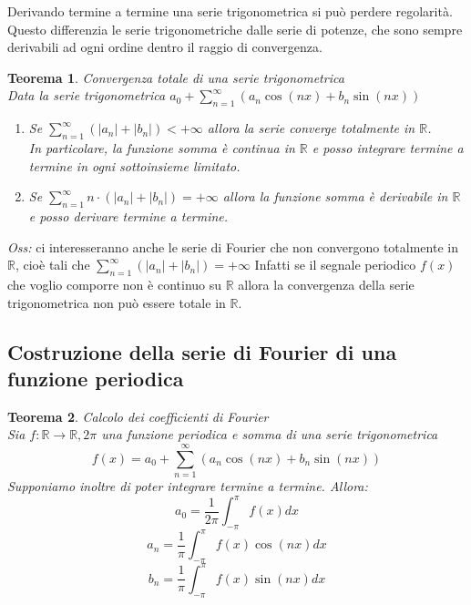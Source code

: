 \documentclass{scrreprt}
\newtheorem{teorema}{Teorema}
\newenvironment{thm}{\begin{mdframed}[backgroundcolor=Ivory2]\begin{teorema}}{\end{teorema}\end{mdframed}}
\begin{document}
Derivando termine a termine una serie trigonometrica si può perdere regolarità. Questo differenzia le serie trigonometriche dalle serie di potenze, che sono sempre derivabili ad ogni ordine dentro il raggio di convergenza.


\begin{thm}
	Convergenza totale di una serie trigonometrica\\
	Data la serie trigonometrica $a_0 + \sum_{n=1}^\infty \left(a_n \cos(nx) + b_n \sin(nx)\right)$
	\begin{enumerate}
		\item[$i)$] Se $\sum_{n=1}^\infty \left(|a_n| + |b_n|\right) <+\infty$ allora la serie converge totalmente in $\mathbb{R}$.\\
				In particolare, la funzione somma è continua in $\mathbb{R}$ e posso integrare termine a termine in ogni sottoinsieme limitato.
		\item[$ii)$] Se $\sum_{n=1}^\infty n\cdot\left(|a_n| + |b_n|\right) =+\infty$ allora la funzione somma è derivabile in $\mathbb{R}$ e posso derivare termine a termine.
	\end{enumerate}
\end{thm}
\emph{Oss:} ci interesseranno anche le serie di Fourier che non convergono totalmente in $\mathbb{R}$, cioè tali che $\sum_{n=1}^\infty \left(|a_n| + |b_n|\right) =+\infty$
Infatti se il segnale periodico $f(x)$ che voglio comporre non è continuo su $\mathbb{R}$ allora la convergenza della serie trigonometrica non può essere totale in $\mathbb{R}$.

\subsection{Costruzione della serie di Fourier di una funzione periodica}
\begin{thm}
	Calcolo dei coefficienti di Fourier\\
	Sia $f:\mathbb{R}\to\mathbb{R}, 2\pi$ una funzione periodica e somma di una serie trigonometrica
	\begin{equation}
		f(x) = a_0 + \sum_{n=1}^\infty \left(a_n \cos(nx) + b_n \sin(nx)\right)
	\end{equation}
	Supponiamo inoltre di poter integrare termine a termine. Allora:
	\begin{equation}
		a_0 = \frac{1}{2\pi}\int_{-\pi}^\pi f(x)dx
	\end{equation}
	\begin{equation}
		a_n = \frac{1}{\pi}\int_{-\pi}^\pi f(x)\cos(nx)dx
	\end{equation}
	\begin{equation}
		b_n = \frac{1}{\pi}\int_{-\pi}^\pi f(x)\sin(nx)dx
	\end{equation}
\end{thm}
\end{document}
